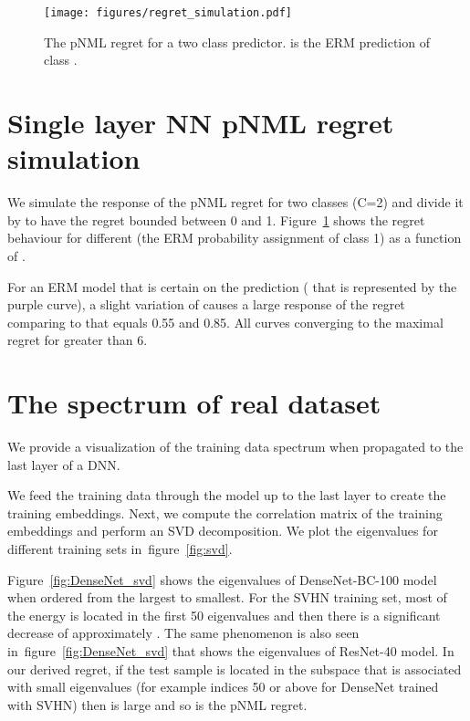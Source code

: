 \documentclass{article}
\def\figref#1{figure~\ref{#1}}
\def\Figref#1{Figure~\ref{#1}}
\begin{document}
\begin{figure}[tbh]
    \centering
    \texttt{[image: figures/regret\_simulation.pdf]}
    \caption{The pNML regret for a two class predictor.  is the ERM prediction of class .}
    \label{fig:regret_simulation}
\end{figure}


\section{Single layer NN pNML regret simulation}
\label{appendix:regret_simulation}

We simulate the response of the pNML regret for two classes (C=2) and divide it by  to have the regret bounded between 0 and 1.
\Figref{fig:regret_simulation} shows the regret behaviour for different  (the ERM probability assignment of class 1) as a function of .

For an ERM model that is certain on the prediction ( that is represented by the purple curve), a slight variation of  causes a large response of the regret comparing to  that equals 0.55 and 0.85. 
All curves converging to the maximal regret for  greater than 6.


\section{The spectrum of real dataset} \label{appendix:spectrum}

We provide a visualization of the training data spectrum when propagated to the last layer of a DNN.

We feed the training data through the model up to the last layer to create the training embeddings. 
Next, we compute the correlation matrix of the training embeddings and perform an SVD decomposition.
We plot the eigenvalues for different training sets in~\figref{fig:svd}. 

\Figref{fig:DenseNet_svd} shows the eigenvalues of DenseNet-BC-100 model when ordered from the largest to smallest.
For the SVHN training set, most of the energy is located in the first 50 eigenvalues and then there is a significant decrease of approximately .
The same phenomenon is also seen in~\figref{fig:DenseNet_svd} that shows the eigenvalues of ResNet-40 model.
In our derived regret, if the test sample is located in the subspace that is associated with small eigenvalues (for example indices 50 or above for DenseNet trained with SVHN) then  is large and so is the pNML regret.
\end{document}
